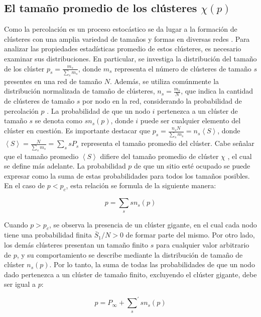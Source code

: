 \subsection{ El tamaño promedio de los clústeres  $ \chi(p)$}\label{sec:Sucebtibilidad}

Como la percolación es un proceso estocástico se da lugar a la formación de clústeres con una amplia variedad de tamaños y formas en diversas redes \cite{aharony_introduction_2017}. Para analizar las propiedades estadísticas promedio de estos clústeres, es necesario examinar sus distribuciones. En particular, se investiga la distribución del tamaño de los clúster  \( p_s=\frac{m_s}{\sum_{s}m_s} \), donde $m_s$ representa el número de clústeres de tamaño $s$ presentes en una red de tamaño $N$. Además, se utiliza comúnmente la distribución normalizada de tamaño de clústeres, \(n_s=\frac{m_s}{N}\), que indica la cantidad de clústeres de tamaño $s$ por nodo en la red, considerando la probabilidad de percolación $p$ \cite{barrat_dynamical_2008}. La probabilidad de que un nodo $i$ pertenezca a un clúster de tamaño $s$ se denota como $sn_s(p)$, donde $i$ puede ser cualquier elemento del clúster en cuestión. Es importante destacar que \(p_s=\frac{n_sN}{\sum_{s}m_s}=n_s\left\langle S \right\rangle \), donde \(\left\langle S \right\rangle =\frac{N}{\sum_{s}m_s} = \sum_{s} sP_s \) representa el tamaño promedio del clúster. Cabe señalar que el tamaño promedio \(\left\langle  S \right\rangle \)   difiere del tamaño promedio de clúster \(\chi\) , el cual se define más adelante. La probabilidad $p$ de que un sitio esté ocupado se puede expresar como la suma de estas probabilidades para todos los tamaños posibles. En el caso de $p < p_c$, esta relación se formula de la siguiente manera:

\begin{equation}\label{eq:12}
p=\sum_{s}{sn_s}(p)
\end{equation}

Cuando $p > p_c$, se observa la presencia de un clúster gigante, en el cual cada nodo tiene una probabilidad finita $\bar{S}_1/N > 0$ de formar parte del mismo. Por otro lado, los demás clústeres presentan un tamaño finito $s$ para cualquier valor arbitrario de $p$, y su comportamiento se describe mediante la distribución de tamaño de clúster $n_s(p)$. Por lo tanto, la suma de todas las probabilidades de que un nodo dado pertenezca a un clúster de tamaño finito, excluyendo el clúster gigante, debe ser igual a $p$:

\begin{equation}\label{eq:13}
	p=P_\infty+{\sum_{s}}^{\prime}sn_s(p) 
\end{equation}

